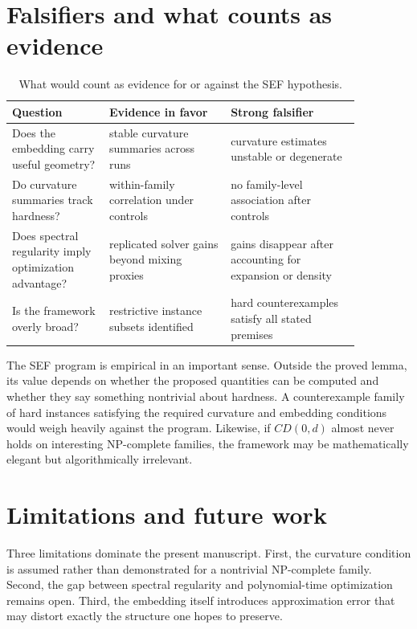 \documentclass{svjour3}
\begin{document}
\section{Falsifiers and what counts as evidence}
\begin{table}[t]
\centering
\caption{What would count as evidence for or against the SEF hypothesis.}
\label{tab:sef-evidence}
\begin{tabular}{p{0.24\linewidth}p{0.30\linewidth}p{0.32\linewidth}}
\toprule
Question & Evidence in favor & Strong falsifier \\
\midrule
Does the embedding carry useful geometry? & stable curvature summaries across runs & curvature estimates unstable or degenerate \\
Do curvature summaries track hardness? & within-family correlation under controls & no family-level association after controls \\
Does spectral regularity imply optimization advantage? & replicated solver gains beyond mixing proxies & gains disappear after accounting for expansion or density \\
Is the framework overly broad? & restrictive instance subsets identified & hard counterexamples satisfy all stated premises \\
\bottomrule
\end{tabular}
\end{table}

The SEF program is empirical in an important sense. Outside the proved lemma, its value depends on whether the proposed quantities can be computed and whether they say something nontrivial about hardness. A counterexample family of hard instances satisfying the required curvature and embedding conditions would weigh heavily against the program. Likewise, if $CD(0,d)$ almost never holds on interesting NP-complete families, the framework may be mathematically elegant but algorithmically irrelevant.

\section{Limitations and future work}
Three limitations dominate the present manuscript. First, the curvature condition is assumed rather than demonstrated for a nontrivial NP-complete family. Second, the gap between spectral regularity and polynomial-time optimization remains open. Third, the embedding itself introduces approximation error that may distort exactly the structure one hopes to preserve.
\end{document}
